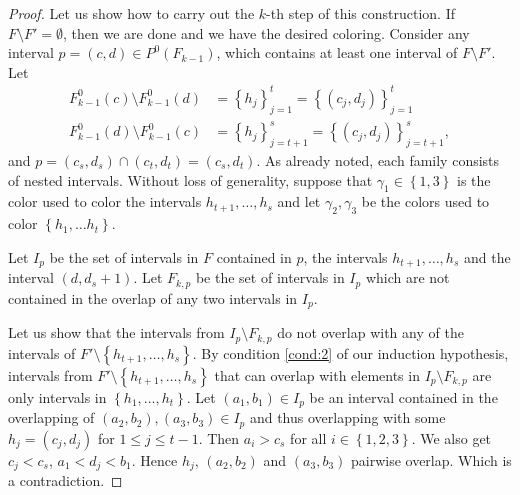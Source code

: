\documentclass[12pt]{article}
\theoremstyle{definition}
\begin{document}
\begin{proof}
        Let us show how to carry out the 
        $k$-th step of this construction.
        If $F \setminus F' = \emptyset$,
        then we are done and we have 
        the desired coloring.
        Consider any interval
        $p = \left(c, d\right)
        \in P^{0}\left(F_{k-1}\right)$,
        which contains at least one interval
        of $F \setminus F'$. 
        Let
        \begin{align*}
            F^{0}_{k-1}\left(c\right) \setminus 
            F^{0}_{k-1}\left(d\right)
            &= \left\{h_{j}\right\}_{j=1}^{t}
            = \left\{\left(c_{j},
            d_{j}\right)\right\}_{j=1}^{t} \\
            F^{0}_{k-1}\left(d\right) \setminus 
            F^{0}_{k-1} \left(c\right)
            &= \left\{h_{j}\right\}_{j=t+1}^{s}
            = \left\{\left(c_{j},
            d_{j}\right)\right\}_{j=t+1}^{s},
        \end{align*}
        and $p = \left(c_{s}, d_{s}\right)
        \cap \left(c_{t}, d_{t}\right) = 
        \left(c_{s}, d_{t}\right)$.
        As already noted, 
        each
        family consists of
        nested intervals.
        Without loss of generality,
        suppose that
        $\gamma_1 \in \left\{1, 3\right\}$
        is the color used to
        color the intervals
        $h_{t+1}, \ldots, h_{s}$
        and 
        let $\gamma_{2}, \gamma_{3}$
        be the colors used to 
        color
        $\left\{h_1, \ldots h_t\right\}$.
        
        Let $I_{p}$ be the
        set of intervals in $F$ 
        contained in $p$,
        the intervals $h_{t+1},
        \ldots, h_{s}$ and the 
        interval 
        $\left(d, d_{s} + 1\right)$.
        Let $F_{k, p}$ be 
        the set of intervals in $I_{p}$ 
        which are not contained in
        the overlap of any two
        intervals in $I_{p}$. 

        Let us show that the 
        intervals from $I_{p}
        \setminus F_{k, p}$ 
        do 
        not overlap with 
        any of the intervals of
        $F' \setminus \left\{
        h_{t+1},\ldots,h_{s}\right\}$.
        By condition \ref{cond:2}
        of our induction hypothesis, 
        intervals from
        $F' \setminus \left\{h_{t+1},
        \ldots, h_{s}\right\}$
        that can overlap with 
        elements in $I_{p} \setminus 
        F_{k,p}$ 
        are only intervals
        in $\left\{h_1, \ldots, h_{t}\right\}$.
        Let $\left(a_1, b_1\right) \in I_{p}$ 
        be an interval contained in the
        overlapping of
        $\left(a_2, b_2\right), 
        \left(a_3, b_3\right)
        \in I_{p}$ and thus
        overlapping with some
        $h_{j} =\left(c_{j}, d_{j}\right)$ 
        for $1 \leq j \leq t-1$.
        Then $a_{i} > c_{s}$ for
        all $i \in \left\{1, 2, 3\right\}$.
        We also get $c_{j} < c_{s}$,
        $a_1 < d_{j} < b_1$. Hence
        $h_{j}$, $\left(a_2, b_2\right)$ 
        and $\left(a_3, b_3\right)$ 
        pairwise overlap.
        Which is a contradiction.


\end{proof}
\end{document}
